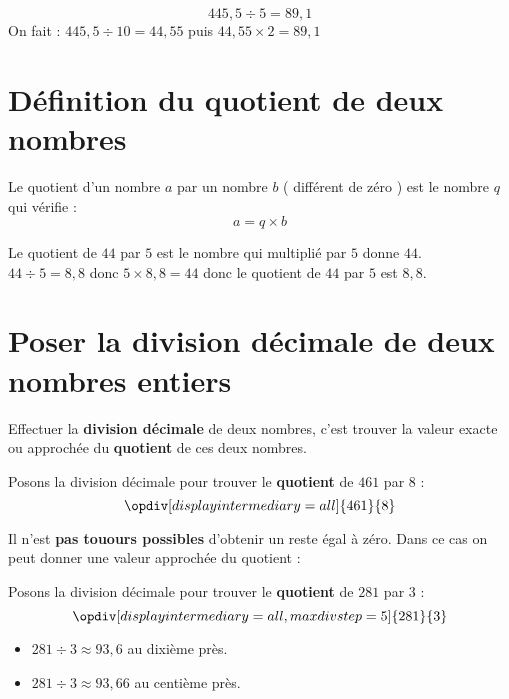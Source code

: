 \begin{pageCours}
\begin{Ex}
\[445,5\div5=89,1\]
On fait : $445,5\div10=44,55$ puis $44,55\times2=89,1$
\end{Ex}

\section{Définition du quotient de deux nombres}

\begin{Def}
Le quotient d'un nombre $a$ par un nombre $b$ ( différent de zéro ) est le nombre $q$ qui vérifie :
\[a=q\times b\]
\end{Def}

\begin{Ex}
Le quotient de $44$ par $5$ est le nombre qui multiplié par $5$ donne $44$.\\
$44\div5=8,8$ donc $5\times8,8=44$ donc le quotient de $44$ par $5$ est $8,8$.
\end{Ex}

\section{Poser la division décimale de deux nombres entiers}

\begin{Def}
Effectuer la \textbf{division décimale} de deux nombres, c'est trouver la valeur exacte ou approchée du \textbf{quotient} de ces deux nombres.
\end{Def}

\begin{Ex}
Posons la division décimale pour trouver le \textbf{quotient} de $461$ par $8$ :
\[\opdiv[displayintermediary=all]{461}{8}\]
\end{Ex}

\begin{Rq}
Il n'est \textbf{pas touours possibles} d'obtenir un reste égal à zéro. Dans ce cas on peut donner une valeur approchée du quotient :
\begin{Ex}
Posons la division décimale pour trouver le \textbf{quotient} de $281$ par $3$ :
\[\opdiv[displayintermediary=all,maxdivstep=5]{281}{3}\]
\begin{itemize}
\item $281 \div 3\approx93,6$ au dixième près.
\item $281 \div 3\approx93,66$ au centième près.
\end{itemize}
\end{Ex}
\end{Rq}




\end{pageCours}
